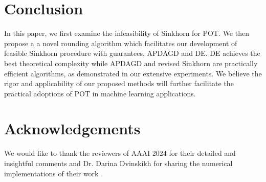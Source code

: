 \section{Conclusion}
In this paper, we first examine the infeasibility of Sinkhorn for POT. We then propose a a novel rounding algorithm which facilitates our development of feasible Sinkhorn procedure with guarantees, APDAGD and DE. DE achieves the best theoretical complexity while APDAGD and revised Sinkhorn are practically efficient algorithms, as demonstrated in our extensive experiments. We believe the rigor and applicability of our proposed methods will further facilitate the practical adoptions of POT in machine learning applications.

\section{Acknowledgements}
We would like to thank the reviewers of AAAI 2024 for their detailed and insightful comments and Dr. Darina Dvinskikh for sharing the numerical implementations of their work \citep{pmlr-v130-dvinskikh21a}. 

